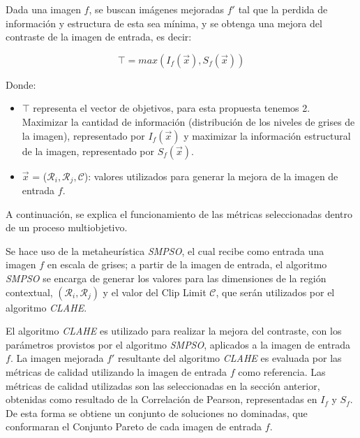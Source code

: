 Dada una imagen $f$, se buscan imágenes mejoradas $f'$ tal que la perdida de información y estructura de esta sea mínima, y se obtenga una mejora del contraste de la imagen de entrada, es decir:

\begin{equation}\label{eq:funcionObj}
    \top = max( I_f (\overrightarrow{x}), S_f (\overrightarrow{x}))
\end{equation}

Donde:
\begin{itemize}
\item $\top$ representa el vector de objetivos, para esta propuesta tenemos 2. Maximizar la cantidad de información (distribución de los niveles de grises de la imagen), representado por $I_f (\overrightarrow{x})$ y maximizar la información estructural de la imagen, representado por $S_f (\overrightarrow{x})$.
\item $\overrightarrow{x}$ = ($\mathcal{R}_i, \mathcal{R}_j, \mathscr{C}$): valores utilizados para generar la mejora de la imagen de entrada $f$.
\end{itemize}

A continuación, se explica el funcionamiento de las métricas seleccionadas dentro de un proceso multiobjetivo.

Se hace uso de la metaheurística \textit{SMPSO}, el cual recibe como entrada una imagen $f$ en escala de grises; a partir de la imagen de entrada, el algoritmo \textit{SMPSO} se encarga de generar los valores para las dimensiones de la región contextual,  $(\mathcal{R}_i,\mathcal{R}_j)$ y el valor del Clip Limit $\mathscr{C}$, que serán utilizados por el algoritmo \textit{CLAHE}.

El algoritmo \textit{CLAHE} es utilizado para realizar la mejora del contraste, con los parámetros provistos por el algoritmo \textit{SMPSO}, aplicados a la imagen de entrada $f$. La imagen mejorada $f'$ resultante del algoritmo \textit{CLAHE} es evaluada por las métricas de calidad utilizando la imagen de entrada $f$ como referencia. Las métricas de calidad utilizadas son las seleccionadas en la sección anterior, obtenidas como resultado de la Correlación  de Pearson, representadas en $I_f$ y $S_f$. De esta forma se obtiene un conjunto de soluciones no dominadas, que conformaran el Conjunto Pareto de cada imagen de entrada $f$.


